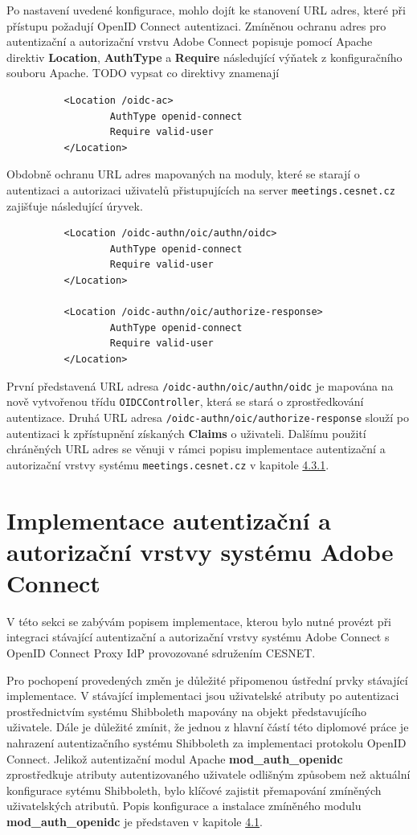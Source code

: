 \documentclass[
  printed, %
  twoside, %
  table,   %
  nolof,     %
  nolot,     %
]{fithesis3}
\begin{document}
Po nastavení uvedené konfigurace, mohlo dojít ke stanovení URL adres, které při přístupu požadují OpenID Connect autentizaci. Zmíněnou ochranu adres pro autentizační a autorizační vrstvu Adobe Connect popisuje pomocí Apache direktiv \textbf{Location}, \textbf{AuthType} a \textbf{Require} následující výňatek z konfiguračního souboru Apache.
TODO vypsat co direktivy znamenají
\begin{lstlisting}
          <Location /oidc-ac>
                  AuthType openid-connect
                  Require valid-user
          </Location>
\end{lstlisting}
\label{ac-location}

Obdobně ochranu URL adres mapovaných na moduly, které se starají o autentizaci a autorizaci uživatelů přistupujících na server \texttt{meetings.cesnet.cz} zajišťuje následující úryvek. 

\begin{lstlisting}
          <Location /oidc-authn/oic/authn/oidc>
                  AuthType openid-connect
                  Require valid-user
          </Location>
          
          <Location /oidc-authn/oic/authorize-response>
                  AuthType openid-connect
                  Require valid-user
          </Location>
\end{lstlisting}
První představená URL adresa \texttt{/oidc-authn/oic/authn/oidc} je mapována na nově vytvořenou třídu \texttt{OIDCController}, která se stará o zprostředkování autentizace. Druhá URL adresa \texttt{/oidc-authn/oic/authorize-response} slouží po autentizaci k zpřístupnění získaných \textbf{Claims} o uživateli. Dalšímu použití  chráněných URL adres se věnuji v rámci popisu implementace autentizační a autorizační vrstvy systému \texttt{meetings.cesnet.cz} v kapitole \hyperref[ShongoImpl-authn]{4.3.1}.

\label{shongo-location}

\section{Implementace autentizační a autorizační vrstvy systému Adobe Connect}
\label{ACImpl}
V této sekci se zabývám popisem implementace, kterou bylo nutné provézt při integraci stávající autentizační a autorizační vrstvy systému Adobe Connect s OpenID Connect Proxy IdP provozované sdružením CESNET. 
\par 
Pro pochopení provedených změn je důležité připomenou ústřední prvky stávající implementace. V stávající implementaci jsou uživatelské atributy po autentizaci prostřednictvím systému Shibboleth mapovány na objekt představujícího uživatele. Dále je důležité zmínit, že jednou z hlavní částí této diplomové práce je nahrazení autentizačního systému Shibboleth za implementaci protokolu OpenID Connect. Jelikož autentizační modul Apache \textbf{mod\_auth\_openidc} zprostředkuje atributy autentizovaného uživatele odlišným způsobem než aktuální konfigurace sytému Shibboleth, bylo klíčové zajistit přemapování zmíněných uživatelských atributů. Popis konfigurace a instalace zmíněného modulu \textbf{mod\_auth\_openidc} je představen v kapitole \hyperref[apacheInstall]{4.1}.  
\par
\end{document}
